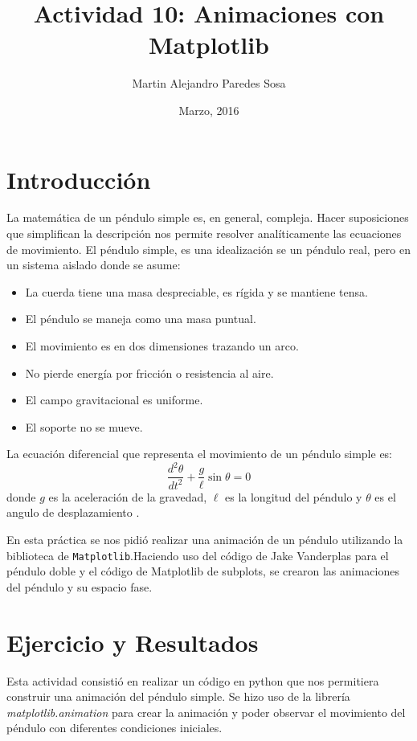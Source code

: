 \documentclass[12pt]{article}
\title{Actividad 10: Animaciones con Matplotlib}
\author{Martin Alejandro Paredes Sosa}
\date{Marzo, 2016}
\begin{document}
\maketitle

\section{Introducción}
\noindent
La matemática de un péndulo simple es, en general, compleja. Hacer suposiciones que simplifican la descripción nos permite resolver analíticamente las ecuaciones de movimiento. El péndulo simple, es una idealización se un péndulo real, pero en un sistema aislado donde se asume:
\begin{itemize}
	\item La cuerda tiene una masa despreciable, es rígida y se mantiene tensa.
	\item El péndulo se maneja como una masa puntual.
	\item El movimiento es en dos dimensiones trazando un arco.
	\item No pierde energía por fricción o resistencia al aire.
	\item El campo gravitacional es uniforme.
	\item El soporte no se mueve.
\end{itemize}

La ecuación diferencial que representa el movimiento de un péndulo simple es:
\begin{equation}\label{EcDf}
	\frac{d^2\theta}{dt^2} + \frac{g}{\ell}\sin\theta = 0
\end{equation}
donde $g$ es la aceleración de la gravedad, $\ell$ es la longitud del péndulo y $\theta$ es el angulo de desplazamiento \cite{PendWiki}.

En esta práctica se nos pidió realizar una animación de un péndulo utilizando la biblioteca de \texttt{Matplotlib}.Haciendo uso del código de Jake Vanderplas para el péndulo doble \cite{cod1} y el código de Matplotlib de subplots\cite{cod2}, se crearon las animaciones del péndulo y su espacio fase.


\section{Ejercicio y Resultados}
Esta actividad consistió en realizar un código en python que nos permitiera construir una animación del péndulo simple. Se hizo uso de la librería \emph{matplotlib.animation} para crear la animación y poder observar el movimiento del péndulo con diferentes condiciones iniciales. \\
\end{document}
